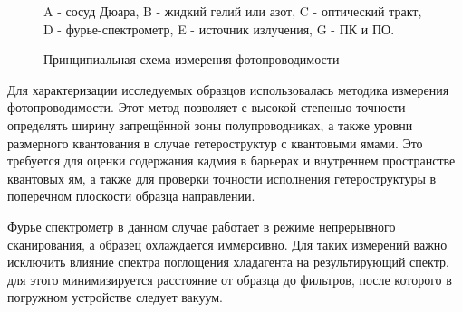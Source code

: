 \documentclass[../main.tex]{subfiles}
\begin{document}
\begin{figure}[h!]
\begin{minipage}[h]{\linewidth}
\begin{center}
                \vspace{0.75cm}
                
                \caption{Принципиальная схема измерения фотопроводимости}
    
                A - сосуд Дюара, B - жидкий гелий или азот, C - оптический тракт, D - фурье-спектрометр, 
                E - источник излучения, G - ПК и ПО.
    
                \vspace{1.25cm}
            \end{center}
            \end{minipage}
        \end{figure}
    Для характеризации исследуемых образцов использовалась методика измерения фотопроводимости. Этот метод позволяет с высокой степенью точности
    определять ширину запрещённой зоны полупроводниках, а также уровни размерного квантования в случае гетероструктур
    с квантовыми ямами. Это требуется для оценки содержания кадмия в барьерах и внутреннем пространстве квантовых ям, а также
    для проверки точности исполнения гетероструктуры в поперечном плоскости образца направлении.

    Фурье спектрометр в данном случае работает в режиме непрерывного сканирования, а образец охлаждается иммерсивно.
    Для таких измерений важно исключить влияние спектра поглощения хладагента на результирующий спектр, для этого
    минимизируется расстояние от образца до фильтров, после которого в погружном устройстве следует вакуум.
    
\end{document}
